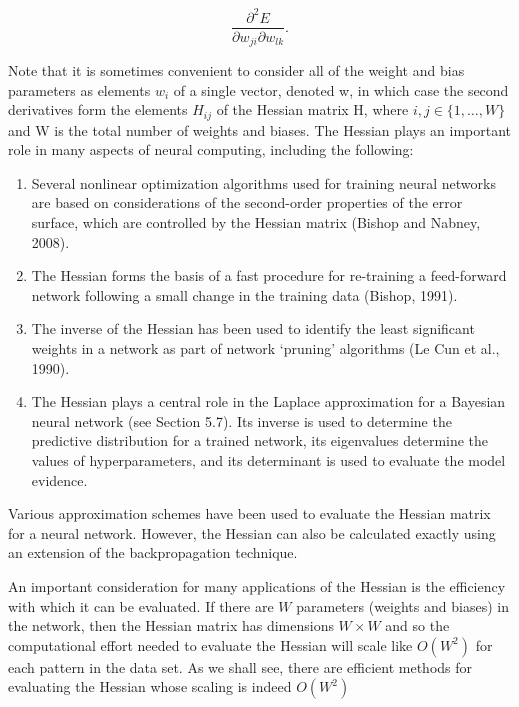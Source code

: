 \documentclass[
  10
]{article}
\begin{document}
\[
\frac {\partial^ {2} E}{\partial w _ {j i} \partial w _ {l k}}.\tag{5.78}
\]

Note that it is sometimes convenient to consider all of the weight and
bias parameters as elements \(w _ { i }\) of a single vector, denoted w,
in which case the second derivatives form the elements \(H _ { i j }\)
of the Hessian matrix H, where \(i , j \in \{ 1 , \dots , W \}\) and W
is the total number of weights and biases. The Hessian plays an
important role in many aspects of neural computing, including the
following:

\begin{enumerate}
\def\labelenumi{\arabic{enumi}.}
\item
  Several nonlinear optimization algorithms used for training neural
  networks are based on considerations of the second-order properties of
  the error surface, which are controlled by the Hessian matrix (Bishop
  and Nabney, 2008).
\item
  The Hessian forms the basis of a fast procedure for re-training a
  feed-forward network following a small change in the training data
  (Bishop, 1991).
\item
  The inverse of the Hessian has been used to identify the least
  significant weights in a network as part of network `pruning'
  algorithms (Le Cun et al., 1990).
\item
  The Hessian plays a central role in the Laplace approximation for a
  Bayesian neural network (see Section 5.7). Its inverse is used to
  determine the predictive distribution for a trained network, its
  eigenvalues determine the values of hyperparameters, and its
  determinant is used to evaluate the model evidence.
\end{enumerate}

Various approximation schemes have been used to evaluate the Hessian
matrix for a neural network. However, the Hessian can also be calculated
exactly using an extension of the backpropagation technique.

An important consideration for many applications of the Hessian is the
efficiency with which it can be evaluated. If there are \(W\) parameters
(weights and biases) in the network, then the Hessian matrix has
dimensions \(W \times W\) and so the computational effort needed to
evaluate the Hessian will scale like \(O ( W ^ { 2 } )\) for each
pattern in the data set. As we shall see, there are efficient methods
for evaluating the Hessian whose scaling is indeed \(O ( W ^ { 2 } )\)
\end{document}
